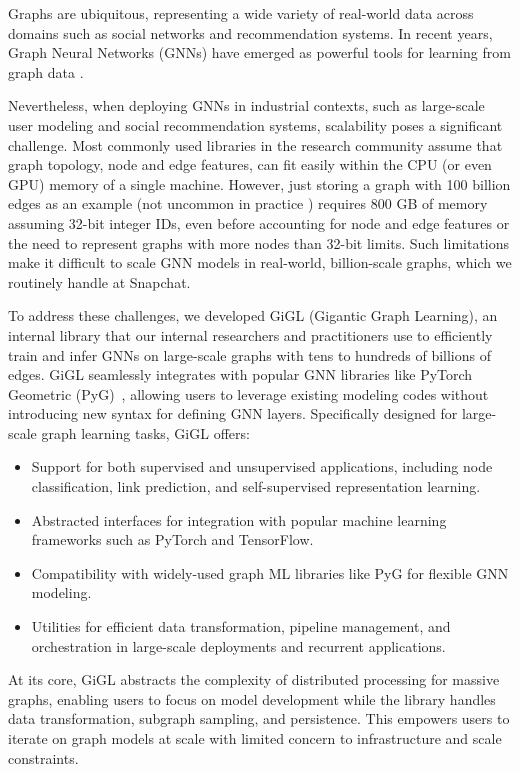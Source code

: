 
Graphs are ubiquitous, representing a wide variety of real-world data across domains such as social networks and recommendation systems. In recent years, Graph Neural Networks (GNNs) have emerged as powerful tools for learning from graph data \cite{kipf2016semi, veličković2018graph, ying2018graph}. 

Nevertheless, when deploying GNNs in industrial contexts, such as large-scale user modeling and social recommendation systems, scalability poses a significant challenge. Most commonly used libraries in the research community assume that graph topology, node and edge features, can fit easily within the CPU (or even GPU) memory of a single machine. However, just storing a graph with 100 billion edges as an example (not uncommon in practice \cite{ching2015one}) requires 800 GB of memory assuming 32-bit integer IDs, even before accounting for node and edge features or the need to represent graphs with more nodes than 32-bit limits.  Such limitations make it difficult to scale GNN models in real-world, billion-scale graphs, which we routinely handle at Snapchat.

To address these challenges, we developed GiGL (Gigantic Graph Learning), an internal library that our internal researchers and practitioners use to efficiently train and infer GNNs on large-scale graphs with tens to hundreds of billions of edges. GiGL seamlessly integrates with popular GNN libraries like PyTorch Geometric (PyG)~\citep{Fey2019pyg}, allowing users to leverage  existing modeling codes without introducing new syntax for defining GNN layers. Specifically designed for large-scale graph learning tasks, GiGL offers:
\begin{itemize}[leftmargin=*]
    \item Support for both supervised and unsupervised applications, including node classification, link prediction, and self-supervised representation learning. 
    \item Abstracted interfaces for integration with popular machine learning frameworks such as PyTorch and TensorFlow.
    \item Compatibility with widely-used graph ML libraries like PyG for flexible GNN modeling.
    \item Utilities for efficient data transformation, pipeline management, and orchestration in large-scale deployments and recurrent applications.
\end{itemize}
At its core, GiGL abstracts the complexity of distributed processing for massive graphs, enabling users to focus on model development while the library handles data transformation, subgraph sampling, and persistence. This empowers users to iterate on graph models at scale with limited concern to infrastructure and scale constraints.

